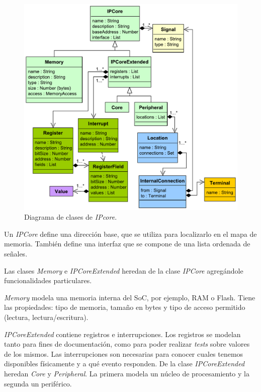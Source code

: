 \begin{figure}[!htbp]
\begin{center}  %
\includegraphics*[width=14cm]{Figures/IPCore.pdf}
\par\caption{Diagrama de clases de \emph{IPcore}.}\label{fig:IPCore}
\end{center}
\end{figure}

Un \emph{IPCore} define una dirección base, que se utiliza para localizarlo en el mapa de memoria. También define una interfaz que se compone de una lista ordenada de señales.

Las clases \emph{Memory} e \emph{IPCoreExtended} heredan de la clase \emph{IPCore} agregándole funcionalidades particulares. 

\emph{Memory} modela una memoria interna del SoC, por ejemplo, RAM o Flash. Tiene las propiedades: tipo de memoria, tamaño en bytes y tipo de acceso permitido (lectura, lectura/escritura).

\emph{IPCoreExtended} contiene registros e interrupciones. Los registros se modelan tanto para fines de documentación, como para poder realizar \emph{tests} sobre valores de los mismos. Las interrupciones son necesarias para conocer cuales tenemos disponibles físicamente y a qué evento responden. De la clase \emph{IPCoreExtended} heredan \emph{Core} y \emph{Peripheral}. La primera modela un núcleo de procesamiento y la segunda un periférico. 

